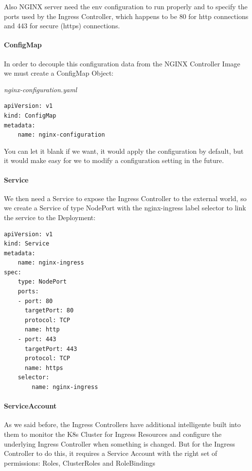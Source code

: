 \documentclass{article}
\newenvironment{codetemplate}[1][]{%
  \mybasecolorbox[#1]
  \itshape
}{%
  \endmybasecolorbox
}
\begin{document}
Also NGINX server need the env configuration to run properly and to specify the ports used by the Ingress Controller, which happens to be 80 for http connections and 443 for secure (https) connections.

\paragraph{ConfigMap}

In order to decouple this configuration data from the NGINX Controller Image we must create a ConfigMap Object:

\begin{codetemplate}{nginx-configuration.yaml}
\begin{verbatim}
apiVersion: v1
kind: ConfigMap
metadata:
    name: nginx-configuration
\end{verbatim}
\end{codetemplate}

You can let it blank if we want, it would apply the configuration by default, but it would make easy for we to modify a configuration setting in the future.

\paragraph{Service}
We then need a Service to expose the Ingress Controller to the external world, so we create a Service of type NodePort with the nginx-ingress label selector to link the service to the Deployment:

\begin{codetemplate}{}
\begin{verbatim}
apiVersion: v1
kind: Service
metadata:
    name: nginx-ingress
spec:
    type: NodePort
    ports:
    - port: 80
      targetPort: 80
      protocol: TCP
      name: http
    - port: 443
      targetPort: 443
      protocol: TCP
      name: https
    selector:
        name: nginx-ingress
\end{verbatim}
\end{codetemplate}

\paragraph{ServiceAccount}

As we said before, the Ingress Controllers have additional intelligente built into them to monitor the K8s Cluster for Ingress Resources and configure the underlying Ingress Controller when something is changed. But for the Ingress Controller to do this, it requires a Service Account with the right set of permissions: Roles, ClusterRoles and RoleBindings
\end{document}
